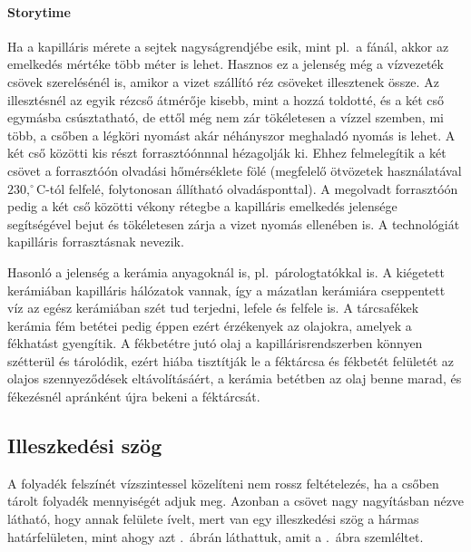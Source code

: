 \documentclass[12pt,a4paper]{scrartcl}
\begin{document}
\paragraph{Storytime} Ha a kapilláris mérete a sejtek nagyságrendjébe esik, mint pl.\ a fánál, akkor az emelkedés mértéke több méter is lehet. Hasznos ez a jelenség még a vízvezeték csövek szerelésénél is, amikor a vizet szállító réz csöveket illesztenek össze. Az illesztésnél az egyik rézcső átmérője kisebb, mint a hozzá toldotté, és a két cső egymásba csúsztatható, de ettől még nem zár tökéletesen a vízzel szemben, mi több, a csőben a légköri nyomást akár néhányszor meghaladó nyomás is lehet. A két cső közötti kis részt forrasztóónnnal hézagolják ki. Ehhez felmelegítik a két csövet a forrasztóón olvadási hőmérséklete fölé (megfelelő ötvözetek használatával $230{,}^\circ$C-tól felfelé, folytonosan állítható olvadásponttal). A megolvadt forrasztóón pedig a két cső közötti vékony rétegbe a kapilláris emelkedés jelensége segítségével bejut és tökéletesen zárja a vizet nyomás ellenében is. A technológiát kapilláris forrasztásnak nevezik.

Hasonló a jelenség a kerámia anyagoknál is, pl.\ párologtatókkal is. A kiégetett kerámiában kapilláris hálózatok vannak, így a mázatlan kerámiára cseppentett víz az egész kerámiában szét tud terjedni, lefele és felfele is. A tárcsafékek kerámia fém betétei pedig éppen ezért érzékenyek az olajokra, amelyek a fékhatást gyengítik. A fékbetétre jutó olaj a kapillárisrendszerben könnyen szétterül és tárolódik, ezért hiába tisztítják le a féktárcsa és fékbetét felületét az olajos szennyeződések eltávolításáért, a kerámia betétben az olaj benne marad, és fékezésnél apránként újra bekeni a féktárcsát.
\normalsize

\subsection{Illeszkedési szög}
A folyadék felszínét vízszintessel közelíteni nem rossz feltételezés, ha a csőben tárolt folyadék mennyiségét adjuk meg. Azonban a csövet nagy nagyításban nézve látható, hogy annak felülete ívelt, mert van egy illeszkedési szög a hármas határfelületen, mint ahogy azt .\ ábrán láthattuk, amit a .\ ábra szemléltet.
\end{document}
